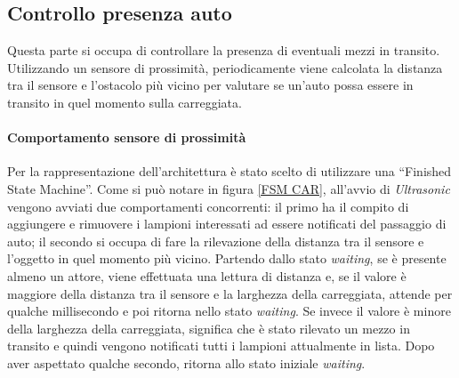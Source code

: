 \subsection{Controllo presenza auto}
Questa parte si occupa di controllare la presenza di eventuali mezzi in transito.
Utilizzando un sensore di prossimità, periodicamente viene calcolata la distanza tra il sensore e l'ostacolo più vicino per valutare se un'auto possa essere in transito in quel momento sulla carreggiata.
\paragraph{Comportamento sensore di prossimità}
Per la rappresentazione dell'architettura è stato scelto di utilizzare una ``Finished State Machine''.
Come si può notare in figura \ref{FSM CAR}, all'avvio di \textit{Ultrasonic} vengono avviati due comportamenti concorrenti: il primo ha il compito di aggiungere e rimuovere i lampioni interessati ad essere notificati del passaggio di auto; il secondo si occupa di fare la rilevazione della distanza tra il sensore e l'oggetto in quel momento più vicino.
Partendo dallo stato \textit{waiting}, se è presente almeno un attore, viene effettuata una lettura di distanza e, se il valore è maggiore della distanza tra il sensore e la larghezza della carreggiata, attende per qualche millisecondo e poi ritorna nello stato \textit{waiting}.
Se invece il valore è minore della larghezza della carreggiata, significa che è stato rilevato un mezzo in transito e quindi vengono notificati tutti i lampioni attualmente in lista.
Dopo aver aspettato qualche secondo, ritorna allo stato iniziale \textit{waiting}.
